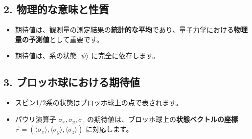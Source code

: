 \documentclass{ltjsarticle}
\begin{document}
\subsection*{2. 物理的な意味と性質}
\begin{itemize}
    \item 期待値は、観測量の測定結果の\textbf{統計的な平均}であり、量子力学における\textbf{物理量の予測値}として重要です。
    \item 期待値は、系の状態 $\ket{\psi}$ に完全に依存します。
\end{itemize}

\subsection*{3. ブロッホ球における期待値}
\begin{itemize}
    \item スピン1/2系の状態はブロッホ球上の点で表されます。
    \item パウリ演算子 $\sigma_x, \sigma_y, \sigma_z$ の期待値は、ブロッホ球上の\textbf{状態ベクトルの座標} $\vec{r} = (\langle \sigma_x \rangle, \langle \sigma_y \rangle, \langle \sigma_z \rangle)$ に対応します。
\end{itemize}
\end{document}
